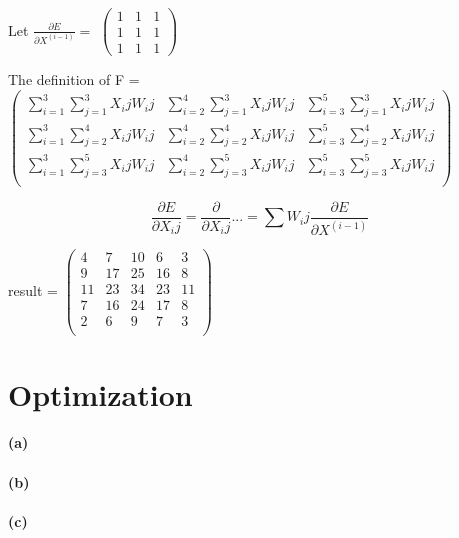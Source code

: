 \documentclass{article}
\begin{document}
Let $\frac{\partial E}{\partial X^(i-1)} = $
$\begin{pmatrix}
  1 & 1 & 1 \\
  1 & 1 & 1 \\
  1 & 1 & 1
\end{pmatrix}$

The definition of F = 
$\begin{pmatrix}
  \sum\limits_{i=1}^{3}\sum\limits_{j=1}^{3} {X_ij W_ij} & \sum\limits_{i=2}^{4}\sum\limits_{j=1}^{3} {X_ij W_ij} & \sum\limits_{i=3}^{5}\sum\limits_{j=1}^{3} {X_ij W_ij} \\
  \sum\limits_{i=1}^{3}\sum\limits_{j=2}^{4} {X_ij W_ij} & \sum\limits_{i=2}^{4}\sum\limits_{j=2}^{4} {X_ij W_ij} & \sum\limits_{i=3}^{5}\sum\limits_{j=2}^{4} {X_ij W_ij} \\
  \sum\limits_{i=1}^{3}\sum\limits_{j=3}^{5} {X_ij W_ij} & \sum\limits_{i=2}^{4}\sum\limits_{j=3}^{5} {X_ij W_ij} & \sum\limits_{i=3}^{5}\sum\limits_{j=3}^{5} {X_ij W_ij} \\
\end{pmatrix}$

\begin{equation}
\frac{\partial E}{\partial X_ij} = \frac{\partial}{\partial X_ij}{...} = \sum\nolimits {W_ij}{ \frac{\partial E}{\partial X^(i-1)}}
\end{equation}

result = 
$\begin{pmatrix}
  4   & 7  & 10 & 6  & 3  \\
  9   & 17 & 25 & 16 & 8  \\
  11  & 23 & 34 & 23 & 11 \\
  7   & 16 & 24 & 17 & 8  \\
  2   & 6  & 9  & 7  & 3  \\
\end{pmatrix}$

\section{Optimization}
\paragraph{(a)}
\paragraph{(b)}
\paragraph{(c)}
\end{document}
